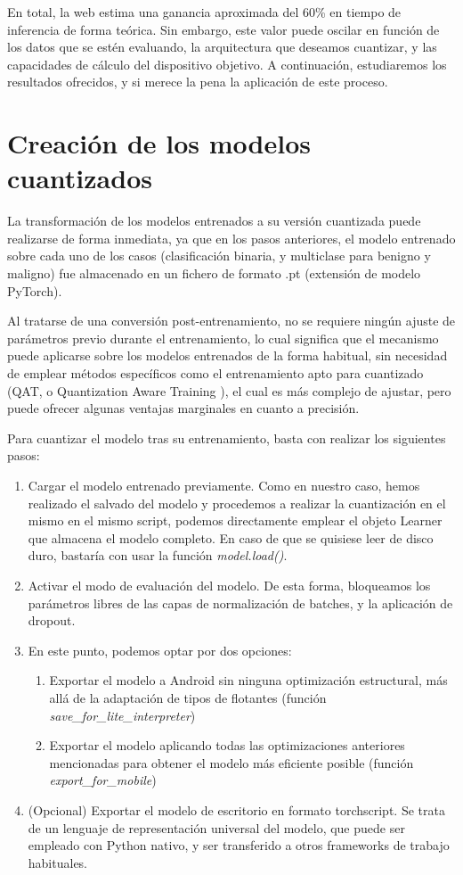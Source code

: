 En total, la web  \cite{pmobile} estima una ganancia aproximada del 60\% en tiempo de inferencia de forma teórica. Sin embargo, este valor puede oscilar en función de los datos que se estén evaluando, la arquitectura que deseamos cuantizar, y las capacidades de cálculo del dispositivo objetivo. A continuación, estudiaremos los resultados ofrecidos, y si merece la pena la aplicación de este proceso.

\section{Creación de los modelos cuantizados}

La transformación de los modelos entrenados a su versión cuantizada puede realizarse de forma inmediata, ya que en los pasos anteriores, el modelo entrenado sobre cada uno de los casos (clasificación binaria, y multiclase para benigno y maligno) fue almacenado en un fichero de formato .pt (extensión de modelo PyTorch).

Al tratarse de una conversión post-entrenamiento, no se requiere ningún ajuste de parámetros previo durante el entrenamiento, lo cual significa que el mecanismo puede aplicarse sobre los modelos entrenados de la forma habitual, sin necesidad de emplear métodos específicos como el entrenamiento apto para cuantizado (QAT, o Quantization Aware Training  \cite{kuzmin2024fp8}), el cual es más complejo de ajustar, pero puede ofrecer algunas ventajas marginales en cuanto a precisión.

Para cuantizar el modelo tras su entrenamiento, basta con realizar los siguientes pasos:
\begin{enumerate}
	\item Cargar el modelo entrenado previamente. Como en nuestro caso, hemos realizado el salvado del modelo y procedemos a realizar la cuantización en el mismo en el mismo script, podemos directamente emplear el objeto Learner que almacena el modelo completo. En caso de que se quisiese leer de disco duro, bastaría con usar la función \textit{model.load()}.
	\item Activar el modo de evaluación del modelo. De esta forma, bloqueamos los parámetros libres de las capas de normalización de batches, y la aplicación de dropout.
	\item En este punto, podemos optar por dos opciones:
	\begin{enumerate}
		\item Exportar el modelo a Android sin ninguna optimización estructural, más allá de la adaptación de tipos de flotantes (función \textit{save\_for\_lite\_interpreter})
		\item Exportar el modelo aplicando todas las optimizaciones anteriores mencionadas para obtener el modelo más eficiente posible (función \textit{export\_for\_mobile})
	\end{enumerate}
	\item (Opcional) Exportar el modelo de escritorio en formato torchscript. Se trata de un lenguaje de representación universal del modelo, que puede ser empleado con Python nativo, y ser transferido a otros frameworks de trabajo habituales.
		
\end{enumerate}

